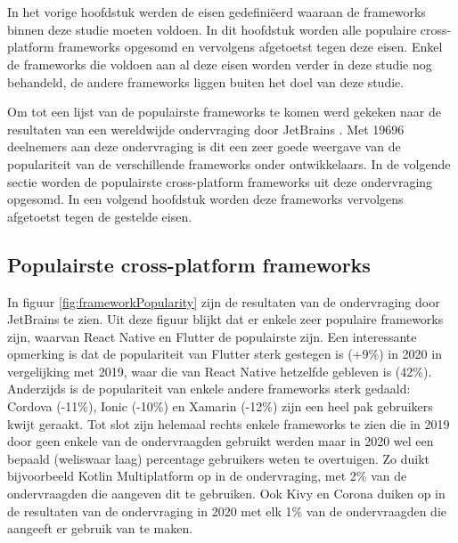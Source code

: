 \chapter{}
\label{ch:selecteren-frameworks}

In het vorige hoofdstuk werden de eisen gedefiniëerd waaraan de frameworks binnen deze studie moeten voldoen. In dit hoofdstuk worden alle populaire cross-platform frameworks opgesomd en vervolgens afgetoetst tegen deze eisen. Enkel de frameworks die voldoen aan al deze eisen worden verder in deze studie nog behandeld, de andere frameworks liggen buiten het doel van deze studie. 

Om tot een lijst van de populairste frameworks te komen werd gekeken naar de resultaten van een wereldwijde ondervraging door JetBrains \autocite{Liu2020}. Met 19696 deelnemers aan deze ondervraging is dit een zeer goede weergave van de populariteit van de verschillende frameworks onder ontwikkelaars. In de volgende sectie worden de populairste cross-platform frameworks uit deze ondervraging opgesomd. In een volgend hoofdstuk worden deze frameworks vervolgens afgetoetst tegen de gestelde eisen.

\section{Populairste cross-platform frameworks}

In figuur \ref{fig:frameworkPopularity} zijn de resultaten van de ondervraging door JetBrains te zien. Uit deze figuur blijkt dat er enkele zeer populaire frameworks zijn, waarvan React Native en Flutter de populairste zijn. Een interessante opmerking is dat de populariteit van Flutter sterk gestegen is (+9\%) in 2020 in vergelijking met 2019, waar die van React Native hetzelfde gebleven is (42\%). Anderzijds is de populariteit van enkele andere frameworks sterk gedaald: Cordova (-11\%), Ionic (-10\%) en Xamarin (-12\%) zijn een heel pak gebruikers kwijt geraakt. Tot slot zijn helemaal rechts enkele frameworks te zien die in 2019 door geen enkele van de ondervraagden gebruikt werden maar in 2020 wel een bepaald (weliswaar laag) percentage gebruikers weten te overtuigen. Zo duikt bijvoorbeeld Kotlin Multiplatform op in de ondervraging, met 2\% van de ondervraagden die aangeven dit te gebruiken. Ook Kivy en Corona duiken op in de resultaten van de ondervraging in 2020 met elk 1\% van de ondervraagden die aangeeft er gebruik van te maken.

